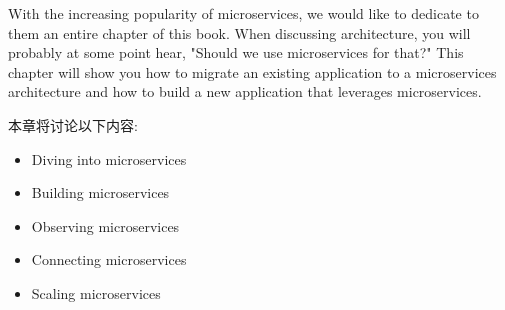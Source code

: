 
With the increasing popularity of microservices, we would like to dedicate to them an entire chapter of this book. When discussing architecture, you will probably at some point hear, "Should we use microservices for that?" This chapter will show you how to migrate an existing application to a microservices architecture and how to build a new application that leverages microservices.

本章将讨论以下内容:

\begin{itemize}
\item 
Diving into microservices

\item 
Building microservices

\item 
Observing microservices

\item 
Connecting microservices

\item 
Scaling microservices
\end{itemize}